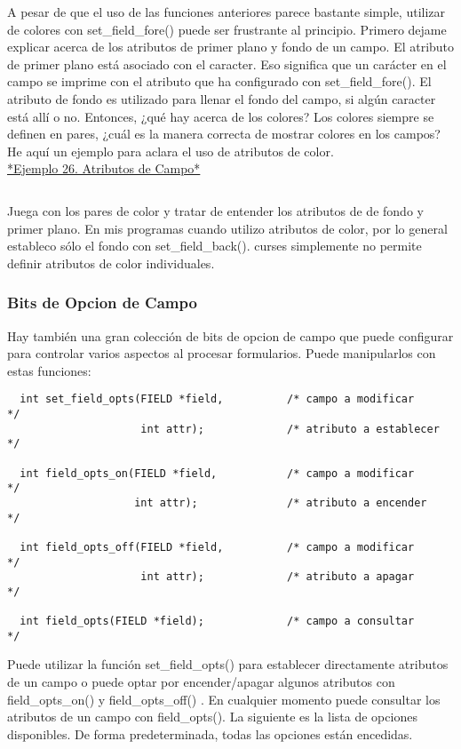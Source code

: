 \documentclass{article}
\begin{document}
A pesar de que el uso de las funciones anteriores parece bastante simple,
utilizar de colores con set\_field\_fore() puede ser frustrante al principio.
Primero dejame explicar acerca de los atributos de primer plano y fondo de un
campo. El atributo de primer plano está asociado con el caracter. Eso significa
que un carácter en el campo se imprime con el atributo que ha configurado con
set\_field\_fore(). El atributo de fondo es utilizado para llenar el fondo del
campo, si algún caracter está allí o no. Entonces, ¿qué hay acerca de los
colores? Los colores siempre se definen en pares, ¿cuál es la manera correcta
de mostrar colores en los campos? He aquí un ejemplo para aclara el uso de
atributos de color.\\

\href{https://github.com/nasciiboy/NCURSES-Programming-HOWTO/blob/master/ncurses_programs/forms/form_attrib.c}{*Ejemplo 26. Atributos de Campo*}
\inputminted{cpp}{./cpp/026_atributos_campo.cpp}

Juega con los pares de color y tratar de entender los atributos de de fondo y
primer plano. En mis programas cuando utilizo atributos de color, por lo
general estableco sólo el fondo con set\_field\_back(). curses simplemente no
permite definir atributos de color individuales.

\subsubsection{Bits de Opcion de Campo}%
Hay también una gran colección de bits de opcion de campo que puede configurar
para controlar varios aspectos al procesar formularios. Puede manipularlos con
estas funciones:

\begin{verbatim}
  int set_field_opts(FIELD *field,          /* campo a modificar          */
                     int attr);             /* atributo a establecer      */

  int field_opts_on(FIELD *field,           /* campo a modificar          */
                    int attr);              /* atributo a encender        */

  int field_opts_off(FIELD *field,          /* campo a modificar          */
                     int attr);             /* atributo a apagar          */

  int field_opts(FIELD *field);             /* campo a consultar          */
\end{verbatim}

Puede utilizar la función set\_field\_opts() para establecer directamente
atributos de un campo o puede optar por encender/apagar algunos atributos con
field\_opts\_on() y field\_opts\_off() . En cualquier momento puede consultar los
atributos de un campo con field\_opts(). La siguiente es la lista de opciones
disponibles. De forma predeterminada, todas las opciones están encedidas.
\end{document}
